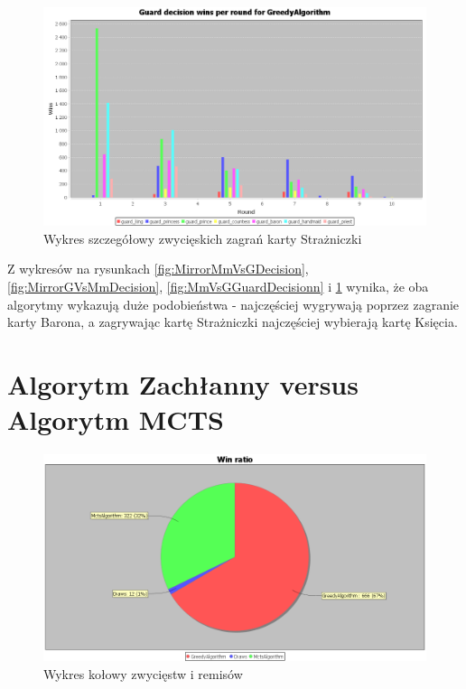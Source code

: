 \begin{figure}[H]
	\centering
	\includegraphics[width=\textwidth]{Resources/MirrorMmVsG/GVsMmGuardDecision.PNG}
	\caption{Wykres szczegółowy zwycięskich zagrań karty Strażniczki} 
	\label{fig:GVsMmGuardDecision}
\end{figure}


Z wykresów na rysunkach \ref{fig:MirrorMmVsGDecision}, \ref{fig:MirrorGVsMmDecision}, \ref{fig:MmVsGGuardDecisionn} i \ref{fig:GVsMmGuardDecision} wynika, że oba algorytmy wykazują duże podobieństwa - najczęściej wygrywają poprzez zagranie karty Barona, a zagrywając kartę Strażniczki najczęściej wybierają kartę Księcia.
\clearpage
\section{Algorytm Zachłanny versus Algorytm MCTS}

\begin{figure}[H]
	\centering
	\includegraphics[width=\textwidth]{Resources/MirrorMctsVG/GVsMctsWin.PNG}
	\caption{Wykres kołowy zwycięstw i remisów} 
	\label{fig:GVsMctsWin}
\end{figure}


